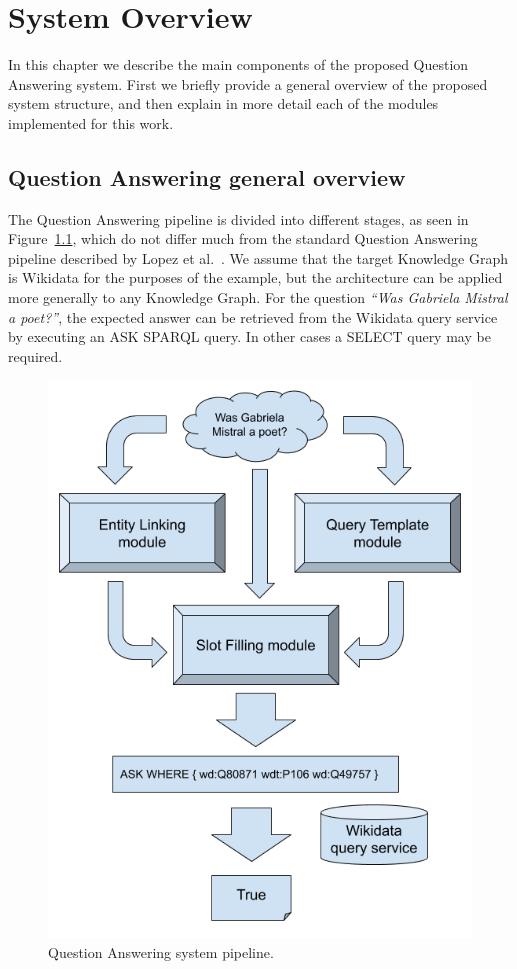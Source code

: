 \chapter{System Overview}
In this chapter we describe the main components of the proposed Question Answering system. 
First we briefly provide a general overview of the proposed system structure, and then explain 
in more detail each of the modules implemented for this work.

\section{Question Answering general overview}
The Question Answering pipeline is divided into different stages, as seen in 
Figure~\ref{fig:questionAnsweringOverview}, which do not differ much from the standard 
Question Answering pipeline described by Lopez et al.~\cite{qa:core-techniques-DiefenbachLSM18}. 
We assume that the target Knowledge Graph is Wikidata for the purposes of the example, but 
the architecture can be applied more generally to any Knowledge Graph. For the question 
\textit{“Was Gabriela Mistral a poet?”}, the expected answer can be retrieved from the 
Wikidata query service by executing an ASK SPARQL query. In other cases a SELECT query may be 
required.

\begin{figure}[!h]
    \centering
    \includegraphics[scale=.45]{imagenes/3_system_overview/questionAnsweringPipeline.png}
    \caption{Question Answering system pipeline.}
    \label{fig:questionAnsweringOverview}
\end{figure}

